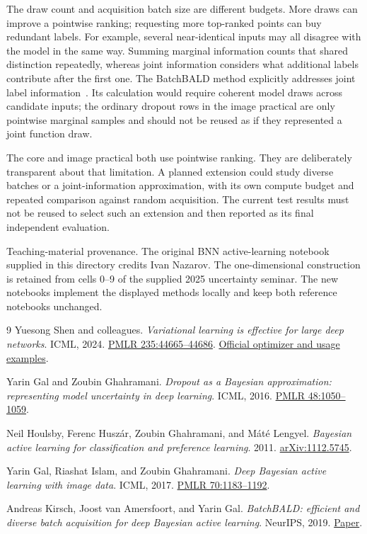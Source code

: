 \documentclass[11pt,a4paper]{article}
\begin{document}
The draw count and acquisition batch size are different budgets. More draws
can improve a pointwise ranking; requesting more top-ranked points can buy
redundant labels. For example, several near-identical inputs may all disagree
with the model in the same way. Summing marginal information counts that
shared distinction repeatedly, whereas joint information considers what
additional labels contribute after the first one.
The BatchBALD method explicitly addresses joint label information~\cite{batchbald}.
Its calculation would require coherent model draws across candidate inputs;
the ordinary dropout rows in the image practical are only pointwise marginal
samples and should not be reused as if they represented a joint function draw.

The core and image practical both use pointwise ranking. They are deliberately
transparent about that limitation. A planned extension could study diverse
batches or a joint-information approximation, with its own compute budget
and repeated comparison against random acquisition. The current test results
must not be reused to select such an extension and then reported as its final
independent evaluation.

Teaching-material provenance. The original BNN active-learning notebook supplied
in this directory credits Ivan Nazarov. The one-dimensional construction is
retained from cells 0--9 of the supplied 2025 uncertainty seminar. The new
notebooks implement the displayed methods locally and keep both reference
notebooks unchanged.

\begin{thebibliography}{9}
Yuesong Shen and colleagues.
\emph{Variational learning is effective for large deep networks}.
ICML, 2024.
\href{https://proceedings.mlr.press/v235/shen24b.html}{PMLR 235:44665--44686}.
\href{https://github.com/team-approx-bayes/ivon}{Official optimizer and usage examples}.

Yarin Gal and Zoubin Ghahramani.
\emph{Dropout as a Bayesian approximation: representing model uncertainty in
deep learning}. ICML, 2016.
\href{https://proceedings.mlr.press/v48/gal16.html}{PMLR 48:1050--1059}.

Neil Houlsby, Ferenc Husz\'ar, Zoubin Ghahramani, and M\'at\'e Lengyel.
\emph{Bayesian active learning for classification and preference learning}.
2011. \href{https://arxiv.org/abs/1112.5745}{arXiv:1112.5745}.

Yarin Gal, Riashat Islam, and Zoubin Ghahramani.
\emph{Deep Bayesian active learning with image data}. ICML, 2017.
\href{https://proceedings.mlr.press/v70/gal17a.html}{PMLR 70:1183--1192}.

Andreas Kirsch, Joost van Amersfoort, and Yarin Gal.
\emph{BatchBALD: efficient and diverse batch acquisition for deep Bayesian
active learning}. NeurIPS, 2019.
\href{https://proceedings.neurips.cc/paper/2019/hash/95323660ed2124450caaac2c46b5ed90-Abstract.html}{Paper}.
\end{thebibliography}
\end{document}
